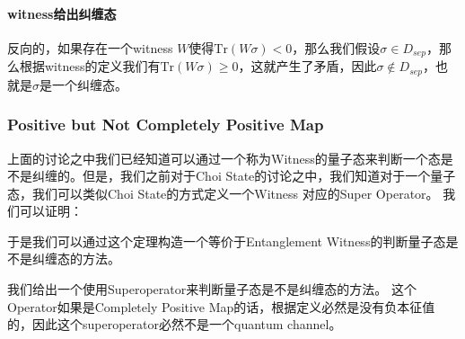 \paragraph{witness给出纠缠态}
反向的，如果存在一个witness $ W $使得$ \mathrm{Tr}(W \sigma) < 0 $，那么我们假设$ \sigma
\in D_{sep} $，那么根据witness的定义我们有$ \mathrm{Tr}(W \sigma) \geq 0
$，这就产生了矛盾，因此$ \sigma \notin D_{sep} $，也就是$ \sigma $是一个纠缠态。

\subsubsection{Positive but Not Completely Positive Map}

\bigskip
{}

上面的讨论之中我们已经知道可以通过一个称为Witness的量子态来判断一个态是不是纠缠的。但是，我们之前对于Choi
State的讨论之中，我们知道对于一个量子态，我们可以类似Choi State的方式定义一个Witness 对应的Super Operator。
我们可以证明：

于是我们可以通过这个定理构造一个等价于Entanglement Witness的判断量子态是不是纠缠态的方法。

\bigskip
{}

我们给出一个使用Superoperator来判断量子态是不是纠缠态的方法。
这个Operator如果是Completely Positive
Map的话，根据定义必然是没有负本征值的，因此这个superoperator必然不是一个quantum channel。

\bigskip
{}

